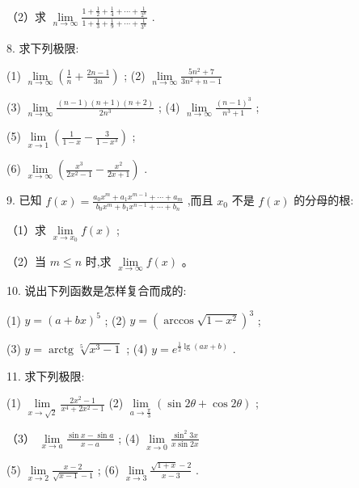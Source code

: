 \documentclass[lang=cn,newtx,12pt,scheme=chinese]{elegantbook}
\begin{document}
（2）求 \(\mathop{\lim }\limits_{{n \rightarrow \infty }}\frac{1 + \frac{1}{2} + \frac{1}{4} + \cdots + \frac{1}{{2}^{n}}}{1 + \frac{1}{3} + \frac{1}{9} + \cdots + \frac{1}{{3}^{n}}}\) .

8. 求下列极限:

(1) \(\mathop{\lim }\limits_{{n \rightarrow \infty }}\left( {\frac{1}{n} + \frac{{2n} - 1}{3n}}\right)\) ; (2) \(\mathop{\lim }\limits_{{n \rightarrow \infty }}\frac{5{n}^{2} + 7}{3{n}^{2} + n - 1}\)

(3) \(\mathop{\lim }\limits_{{n \rightarrow \infty }}\frac{\left( {n - 1}\right) \left( {n + 1}\right) \left( {n + 2}\right) }{2{n}^{3}}\) ; (4) \(\mathop{\lim }\limits_{{n \rightarrow \infty }}\frac{{\left( n - 1\right) }^{3}}{{n}^{3} + 1}\) ;

(5) \(\mathop{\lim }\limits_{{x \rightarrow 1}}\left( {\frac{1}{1 - x} - \frac{3}{1 - {x}^{3}}}\right)\) ;

(6) \(\mathop{\lim }\limits_{{x \rightarrow \infty }}\left( {\frac{{x}^{3}}{2{x}^{2} - 1} - \frac{{x}^{2}}{{2x} + 1}}\right)\) .

9. 已知 \(f\left( x\right) = \frac{{a}_{0}{x}^{m} + {a}_{1}{x}^{m - 1} + \cdots + {a}_{m}}{{b}_{0}{x}^{m} + {b}_{1}{x}^{n - 1} + \cdots + {b}_{n}}\) ,而且 \({x}_{0}\) 不是 \(f\left( x\right)\) 的分母的根:

（1）求 \(\mathop{\lim }\limits_{{x \rightarrow {x}_{0}}}f\left( x\right)\) ;

（2）当 \(m \leq n\) 时,求 \(\mathop{\lim }\limits_{{x \rightarrow \infty }}f\left( x\right)\) 。

10. 说出下列函数是怎样复合而成的:

(1) \(y = {\left( a + bx\right) }^{5}\) ; (2) \(y = {\left( \arccos \sqrt{1 - {x}^{2}}\right) }^{3}\) ;

(3) \(y = \operatorname{arctg}\sqrt[5]{{x}^{3} - 1}\) ; (4) \(y = {e}^{\frac{1}{2}\lg \left( {{ax} + b}\right) }\) .

11. 求下列极限:

(1) \(\mathop{\lim }\limits_{{x \rightarrow \sqrt{2}}}\frac{2{x}^{2} - 1}{{x}^{4} + 2{x}^{2} - 1}\) (2) \(\mathop{\lim }\limits_{{a \rightarrow \frac{\pi }{3}}}\left( {\sin {2\theta } + \cos {2\theta }}\right)\) ;

（3） \(\mathop{\lim }\limits_{{x \rightarrow a}}\frac{\sin x - \sin a}{x - a}\) ; (4) \(\mathop{\lim }\limits_{{x \rightarrow 0}}\frac{{\sin }^{2}{3x}}{x\sin {2x}}\)

(5) \(\mathop{\lim }\limits_{{x \rightarrow 2}}\frac{x - 2}{\sqrt{x - 1} - 1}\) ; (6) \(\mathop{\lim }\limits_{{x \rightarrow 3}}\frac{\sqrt{1 + x} - 2}{x - 3}\) .
\end{document}
